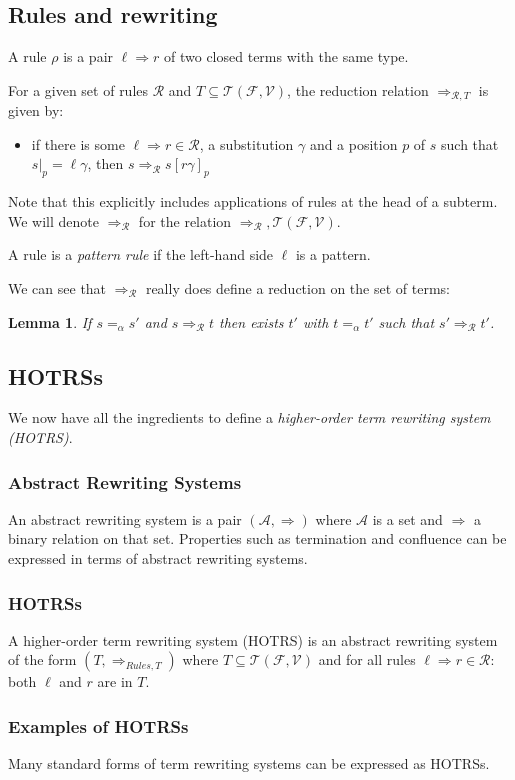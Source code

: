 \documentclass{lmcs}
\theoremstyle{theorem}\newtheorem{theorem}{Theorem}
\theoremstyle{theorem}\newtheorem{lemma}[theorem]{Lemma}
\theoremstyle{theorem}\newtheorem{corollary}[theorem]{Corollary}
\theoremstyle{definition}\newtheorem{definition}[theorem]{Definition}
\theoremstyle{definition}\newtheorem{example}[theorem]{Example}
\newcommand{\F}{\mathcal{F}}
\newcommand{\V}{\mathcal{V}}
\newcommand{\Terms}{\mathcal{T}}
\newcommand{\Rules}{\mathcal{R}}
\newcommand{\arrz}{\Rightarrow}
\newcommand{\arr}[1]{\arrz_{#1}}
\newcommand{\mysubsection}[1]{\vspace{-12pt}\subsubsection{#1}}
\begin{document}
\subsection{Rules and rewriting}

A rule $\rho$ is a pair $\ell \arrz r$ of two closed terms with the same type.

For a given set of rules $\Rules$ and $T \subseteq \Terms(\F,\V)$, the reduction relation
$\arr{\Rules,T}$ is given by:
\begin{itemize}
\item if there is some $\ell \arrz r \in \Rules$, a substitution $\gamma$ and a position $p$ of
  $s$ such that $s|_p = \ell\gamma$, then $s \arr{\Rules} s[r\gamma]_p$
\end{itemize}

\medskip
Note that this explicitly includes applications of rules at the head of a subterm.
We will denote $\arr{\Rules}$ for the relation $\arr{\Rules},\Terms(\F,\V)$.

A rule is a \emph{pattern rule} if the left-hand side $\ell$ is a pattern.

We can see that $\arr{\Rules}$ really does define a reduction on the set of terms:

\begin{lemma}
If $s =_\alpha s'$ and $s \arr{\Rules} t$ then exists $t'$ with $t =_\alpha t'$ such that
$s' \arr{\Rules} t'$.
\end{lemma}

\subsection{HOTRSs}

We now have all the ingredients to define a \emph{higher-order term rewriting system (HOTRS)}.

\mysubsection{Abstract Rewriting Systems}

An abstract rewriting system is a pair $(\mathcal{A},\arrz)$ where $\mathcal{A}$ is a set and
$\arrz$ a binary relation on that set.  Properties such as termination and confluence can be
expressed in terms of abstract rewriting systems.

\mysubsection{HOTRSs}

A higher-order term rewriting system (HOTRS) is an abstract rewriting system of the form
$(T,\arr{Rules,T})$ where $T \subseteq \Terms(\F,\V)$ and for all rules $\ell \arrz r \in \Rules$:
both $\ell$ and $r$ are in $T$.

\mysubsection{Examples of HOTRSs}
Many standard forms of term rewriting systems can be expressed as HOTRSs.
\end{document}

